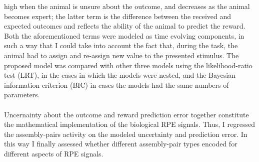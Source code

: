 high when the animal is unsure about the outcome, and decreases as the animal becomes expert; the latter term is the difference between the received and expected outcomes and reflects the ability of the animal to predict the reward. Both the aforementioned terms were modeled as time evolving components, in such a way that I could take into account the fact that, during the task, the animal had to assign and re-assign new value to the presented stimulus. The proposed model was compared with other three models using the likelihood-ratio test (LRT), in the cases in which the models were nested, and the Bayesian information criterion (BIC) in cases the models had the same numbers of parameters.\\\\Uncernainty about the outcome and reward prediction error together constitute the mathematical implementation of the biological RPE signals. Thus, I regressed the assembly-pairs activity on the modeled uncertainty and prediction error. In this way I finally assessed whether different assembly-pair types encoded for different aspects of RPE signals.

